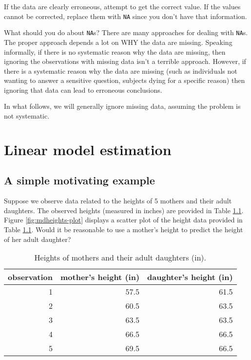 \documentclass[
]{book}
\theoremstyle{definition}
\theoremstyle{definition}
\theoremstyle{definition}
\theoremstyle{definition}
\theoremstyle{remark}
\begin{document}
If the data are clearly erroneous, attempt to get the correct value. If the values cannot be corrected, replace them with \texttt{NA} since you don't have that information.

What should you do about \texttt{NA}s? There are many approaches for dealing with \texttt{NA}s. The proper approach depends a lot on WHY the data are missing. Speaking informally, if there is no systematic reason why the data are missing, then ignoring the observations with missing data isn't a terrible approach. However, if there is a systematic reason why the data are missing (such as individuals not wanting to answer a sensitive question, subjects dying for a specific reason) then ignoring that data can lead to erroneous conclusions.

In what follows, we will generally ignore missing data, assuming the problem is not systematic.

\hypertarget{linear-model-estimation}{%
\chapter{Linear model estimation}\label{linear-model-estimation}}

\hypertarget{a-simple-motivating-example}{%
\section{A simple motivating example}\label{a-simple-motivating-example}}

Suppose we observe data related to the heights of 5 mothers and their adult daughters. The observed heights (measured in inches) are provided in Table \ref{tab:mdheights}. Figure \ref{fig:mdheights-plot} displays a scatter plot of the height data provided in Table \ref{tab:mdheights}. Would it be reasonable to use a mother's height to predict the height of her adult daughter?

\begin{table}

\caption{\label{tab:mdheights}Heights of mothers and their adult daughters (in).}
\centering
\begin{tabular}[t]{rrr}
\toprule
observation & mother's height (in) & daughter's height (in)\\
\midrule
1 & 57.5 & 61.5\\
2 & 60.5 & 63.5\\
3 & 63.5 & 63.5\\
4 & 66.5 & 66.5\\
5 & 69.5 & 66.5\\
\bottomrule
\end{tabular}
\end{table}
\end{document}
